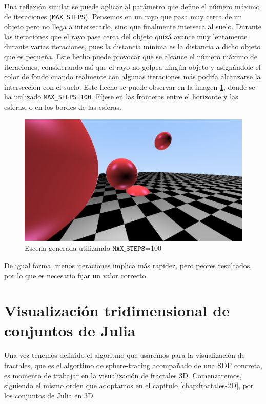 Una reflexión similar se puede aplicar al parámetro que define el número máximo de iteraciones (\verb|MAX_STEPS|). Pensemos en un rayo que pasa muy cerca de un objeto pero no llega a intersecarlo, sino que finalmente interseca al suelo. Durante las iteraciones que el rayo pase cerca del objeto quizá avance muy lentamente durante varias iteraciones, pues la distancia mínima es la distancia a dicho objeto que es pequeña. Este hecho puede provocar que se alcance el número máximo de iteraciones, considerando así que el rayo no golpea ningún objeto y asignándole el color de fondo cuando realmente con algunas iteraciones más podría alcanzarse la intersección con el suelo. Este hecho se puede observar en la imagen \ref{fig:pocas-iteraciones}, donde se ha utilizado \verb|MAX_STEPS=100|. Fíjese en las fronteras entre el horizonte y las esferas, o en los bordes de las esferas.

\begin{figure} [ht]
    \centering
    \includegraphics[scale = 0.3]{img/C9/pocas-iteraciones.png}
    \caption{Escena generada utilizando $\mathtt{MAX\_STEPS}$=100}
    \label{fig:pocas-iteraciones}
\end{figure}

De igual forma, menos iteraciones implica más rapidez, pero peores resultados, por lo que es necesario fijar un valor correcto.

\section{Visualización tridimensional de conjuntos de Julia}

Una vez tenemos definido el algoritmo que usaremos para la visualización de fractales, que es el algortimo de sphere-tracing acompañado de una SDF concreta, es momento de trabajar en la visualización de fractales 3D. Comenzaremos, siguiendo el mismo orden que adoptamos en el capítulo \ref{chap:fractales-2D}, por los conjuntos de Julia en 3D.

